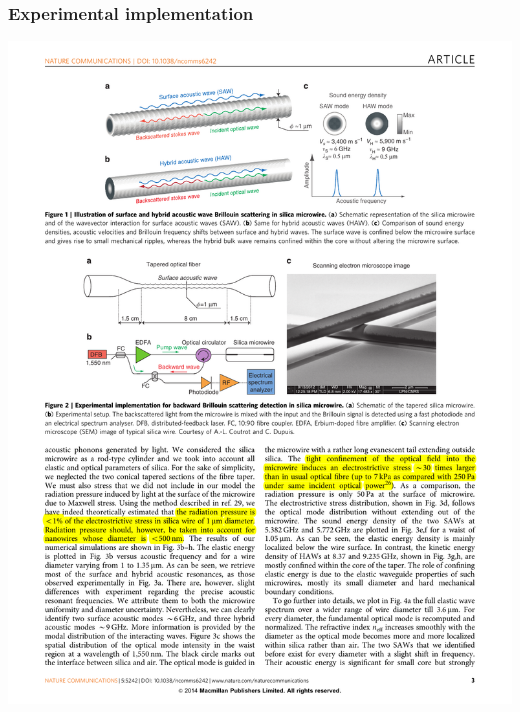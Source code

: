 \documentclass{beamer}
\begin{document}
\begin{frame}
\frametitle{Experimental implementation}
\begin{center}
\includegraphics[width=0.8\columnwidth]{f2ab.pdf}
\end{center}
\end{frame}
\end{document}
